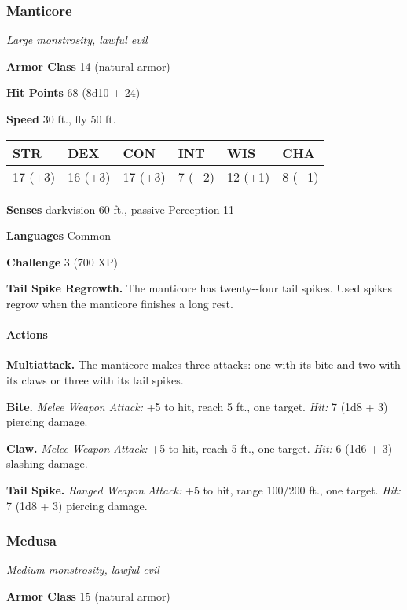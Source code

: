 \documentclass[
]{article}
\begin{document}
\hypertarget{manticore}{%
\subsubsection{Manticore}\label{manticore}}

\emph{Large monstrosity, lawful evil}

\textbf{Armor Class} 14 (natural armor)

\textbf{Hit Points} 68 (8d10 + 24)

\textbf{Speed} 30 ft., fly 50 ft.

\begin{longtable}[]{@{}llllll@{}}
\toprule
STR & DEX & CON & INT & WIS & CHA\tabularnewline
\midrule
\endhead
17 (+3) & 16 (+3) & 17 (+3) & 7 (−2) & 12 (+1) & 8 (−1)\tabularnewline
\bottomrule
\end{longtable}

\textbf{Senses} darkvision 60 ft., passive Perception 11

\textbf{Languages} Common

\textbf{Challenge} 3 (700 XP)

\textbf{Tail Spike Regrowth.} The manticore has twenty-­‐four tail
spikes. Used spikes regrow when the manticore finishes a long rest.

\hypertarget{actions-1}{%
\paragraph{Actions}\label{actions-1}}

\textbf{Multiattack.} The manticore makes three attacks: one with its
bite and two with its claws or three with its tail spikes.

\textbf{Bite.} \emph{Melee Weapon Attack:} +5 to hit, reach 5 ft., one
target. \emph{Hit:} 7 (1d8 + 3) piercing damage.

\textbf{Claw.} \emph{Melee Weapon Attack:} +5 to hit, reach 5 ft., one
target. \emph{Hit:} 6 (1d6 + 3) slashing damage.

\textbf{Tail Spike.} \emph{Ranged Weapon Attack:} +5 to hit, range
100/200 ft., one target. \emph{Hit:} 7 (1d8 + 3) piercing damage.

\hypertarget{medusa}{%
\subsubsection{Medusa}\label{medusa}}

\emph{Medium monstrosity, lawful evil}

\textbf{Armor Class} 15 (natural armor)
\end{document}
